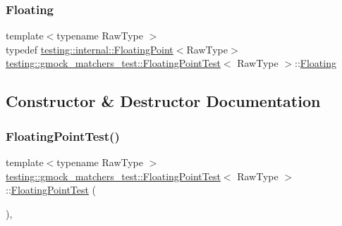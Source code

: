 \mbox{\label{classtesting_1_1gmock__matchers__test_1_1FloatingPointTest_ae1459f93e1b18426625daf4fa98e80c6}} 
\subsubsection{\texorpdfstring{Floating}{Floating}}
{\footnotesize\ttfamily template$<$typename Raw\+Type $>$ \\
typedef \mbox{\hyperlink{classtesting_1_1internal_1_1FloatingPoint}{testing\+::internal\+::\+Floating\+Point}}$<$Raw\+Type$>$ \mbox{\hyperlink{classtesting_1_1gmock__matchers__test_1_1FloatingPointTest}{testing\+::gmock\+\_\+matchers\+\_\+test\+::\+Floating\+Point\+Test}}$<$ Raw\+Type $>$\+::\mbox{\hyperlink{classtesting_1_1gmock__matchers__test_1_1FloatingPointTest_ae1459f93e1b18426625daf4fa98e80c6}{Floating}}\hspace{0.3cm}{\ttfamily [protected]}}



\subsection{Constructor \& Destructor Documentation}
\mbox{\label{classtesting_1_1gmock__matchers__test_1_1FloatingPointTest_af2fb52db3abf63903d78541c4c3a17d3}} 
\subsubsection{\texorpdfstring{FloatingPointTest()}{FloatingPointTest()}}
{\footnotesize\ttfamily template$<$typename Raw\+Type $>$ \\
\mbox{\hyperlink{classtesting_1_1gmock__matchers__test_1_1FloatingPointTest}{testing\+::gmock\+\_\+matchers\+\_\+test\+::\+Floating\+Point\+Test}}$<$ Raw\+Type $>$\+::\mbox{\hyperlink{classtesting_1_1gmock__matchers__test_1_1FloatingPointTest}{Floating\+Point\+Test}} (\begin{DoxyParamCaption}{ }\end{DoxyParamCaption})\hspace{0.3cm}{\ttfamily [inline]}, {\ttfamily [protected]}}



